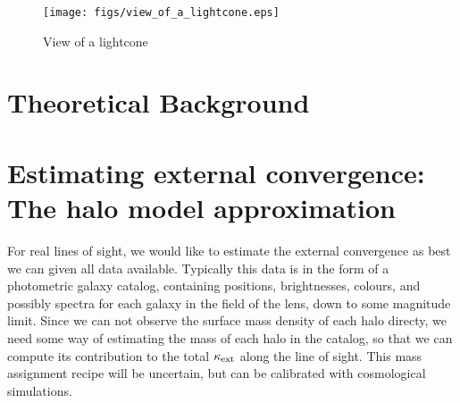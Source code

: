 \documentclass[useAMS,usenatbib]{mn2e}
\begin{document}


\begin{figure}
\texttt{[image: figs/view\_of\_a\_lightcone.eps]}
\caption[magcut]{View of a lightcone}
\label{fig:lightcone}
\end{figure}




\section{Theoretical Background}
\label{sec:theory}






\section{Estimating external convergence: The halo model approximation}
\label{sec:model}



For real lines of sight, we would like to estimate the external convergence as best we can given all
data available. Typically this data is in the form of a photometric galaxy
catalog, containing positions, brightnesses, colours, and possibly spectra for each galaxy in the
field of the lens, down to some magnitude
limit. Since we can not observe the surface mass density of each halo
directy, we need some way of estimating
the mass of each halo in the catalog, so that we can compute its
contribution to the total $\kappa_{\rm ext}$ along the line of sight. This mass assignment recipe will be uncertain, but
can be calibrated with cosmological simulations.
\end{document}
